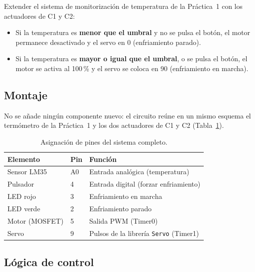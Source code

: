 \documentclass{upo-master}
\begin{document}
\begin{enunciado}
Extender el sistema de monitorización de temperatura de la Práctica~1 con
los actuadores de C1 y C2:
\begin{itemize}
  \item Si la temperatura es \textbf{menor que el umbral} y no se pulsa el
        botón, el motor permanece desactivado y el servo en 0\textdegree{}
        (enfriamiento parado).
  \item Si la temperatura es \textbf{mayor o igual que el umbral}, o se pulsa
        el botón, el motor se activa al 100\,\% y el servo se coloca en
        90\textdegree{} (enfriamiento en marcha).
\end{itemize}
\end{enunciado}

\subsection{Montaje}

No se añade ningún componente nuevo: el circuito reúne en un mismo esquema
el termómetro de la Práctica~1 y los dos actuadores de C1 y C2
(Tabla~\ref{tab:pines-c3}).

\begin{table}[htbp]
  \centering
  \caption{Asignación de pines del sistema completo.}
  \label{tab:pines-c3}
  \begin{tabular}{lll}
    \toprule
    \textbf{Elemento} & \textbf{Pin} & \textbf{Función} \\
    \midrule
    Sensor LM35   & A0 & Entrada analógica (temperatura) \\
    Pulsador      & 4  & Entrada digital (forzar enfriamiento) \\
    LED rojo      & 3  & Enfriamiento en marcha \\
    LED verde     & 2  & Enfriamiento parado \\
    Motor (MOSFET)& 5  & Salida PWM (Timer0) \\
    Servo         & 9  & Pulsos de la librería \texttt{Servo} (Timer1) \\
    \bottomrule
  \end{tabular}
\end{table}


\subsection{Lógica de control}
\end{document}
